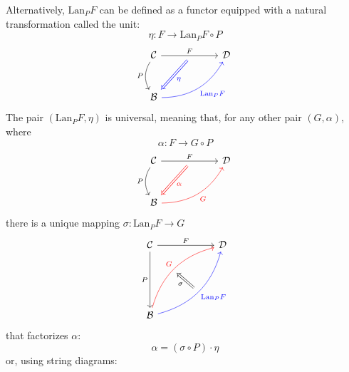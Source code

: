 \documentclass[DaoFP]{subfiles}
\begin{document}
Alternatively, $\text{Lan}_P F$ can be defined as a functor equipped with a natural transformation called the unit:
\[ \eta \colon F \to \text{Lan}_P F \circ P \]
\[
 \begin{tikzcd} [row sep=1cm, column sep=1cm]
 \cat C
 \arrow[rr, "F", "" {name=ID, below} ]
 \arrow[d, bend right, "P"']
 && \cat D
 \\
 \cat B
  \arrow[urr, blue, bend right, "\text{Lan}_P F"']
 \arrow[Rightarrow, blue, "\eta",  from=ID]
 \end{tikzcd}
\]
The pair $(\text{Lan}_P F, \eta)$ is universal, meaning that, for any other pair $(G, \alpha)$, where 
\[ \alpha \colon F \to G \circ P\] 
\[
 \begin{tikzcd} [row sep=1cm, column sep=1cm]
 \cat C
 \arrow[rr, "F", "" {name=ID, below} ]
 \arrow[d, bend right, "P"']
 && \cat D
 \\
 \cat B
  \arrow[urr, red, bend right, "G"']
 \arrow[Rightarrow, red, "\alpha",  from=ID]
 \end{tikzcd}
\]
there is a unique mapping $\sigma \colon \text{Lan}_P F \to G$ 
\[
\begin{tikzcd}[row sep=2cm, column sep=2cm]
\cat C  \ar[d, "P"', "" {name=P}]
            \ar[r, "F", ""  {name=F, below, near start, bend right}]
&
\cat D
\\
\cat B
    \ar[ur, red, bend left, "G", "" {name=G, below}]
    \ar[ur, blue, bend right, "\text{Lan}_P F"', "" {name=Lan}]
\arrow[Rightarrow, "\sigma", from=Lan, to=G]
\end{tikzcd}
\]
that factorizes $\alpha$:
\[ \alpha = (\sigma \circ P) \cdot \eta \]
or, using string diagrams:
\end{document}
